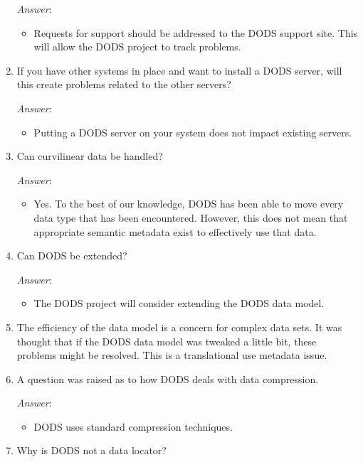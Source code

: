 \begin{enumerate}
\emph{Answer}:
  \begin{itemize}
  \item Requests for support should be addressed to the DODS support
    site.  This will allow the DODS project to track problems.
  \end{itemize}

\item If you have other systems in place and want to install a DODS
  server, will this create problems related to the other servers?
  
\emph{Answer}:
  \begin{itemize}
  \item Putting a DODS server on your system does not impact existing servers.
  \end{itemize}

\item Can curvilinear data be handled?  

\emph{Answer}:
\begin{itemize}
\item Yes.  To the best of our knowledge, DODS has been able to move
  every data type that has been encountered.  However, this does not
  mean that appropriate semantic metadata exist to effectively use
  that data.
\end{itemize}


\item Can DODS be extended? 

\emph{Answer}:
  \begin{itemize}
  \item The DODS project will consider extending the DODS data model.
  \end{itemize}

\item The efficiency of the data model is a concern for complex data
sets.  It was thought that if the DODS data model was tweaked a little
bit, these problems might be resolved.  This is a translational use
metadata issue.

\item  A question was raised as to how DODS deals with data compression.

\emph{Answer}:
\begin{itemize}
  \item DODS uses standard compression techniques.
\end{itemize}

\item Why is DODS not a data locator?



\end{enumerate}
